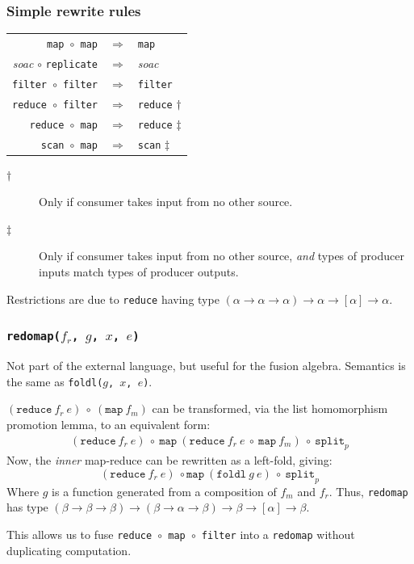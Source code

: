 \documentclass[rgb,dvipsnames]{beamer}
\begin{document}
\begin{frame}[fragile]
  \frametitle{Simple rewrite rules}

  \begin{center}
    \begin{tabular}{rcl}
      \texttt{map $\circ$ map}    & $\Rightarrow$ & \texttt{map} \\
      \textit{soac} $\circ$ \texttt{replicate} & $\Rightarrow$ & \textit{soac} \\
      \texttt{filter $\circ$ filter} & $\Rightarrow$ & \texttt{filter}  \\
      \texttt{reduce $\circ$ filter} & $\Rightarrow$ & \texttt{reduce} $\dag$  \\
      \texttt{reduce $\circ$ map} & $\Rightarrow$ & \texttt{reduce} $\ddag$ \\
      \texttt{scan $\circ$ map} & $\Rightarrow$ & \texttt{scan} $\ddag$ \\
    \end{tabular}
  \end{center}

  \begin{description}
  \item[$\dag$] Only if consumer takes input from no other
    source.
  \item[$\ddag$] Only if consumer takes input from no other source,
    \textit{and} types of producer inputs match types of producer
    outputs.
  \end{description}

  Restrictions are due to \texttt{reduce} having type
  $(\alpha\rightarrow\alpha\rightarrow\alpha)\rightarrow\alpha\rightarrow[\alpha]\rightarrow\alpha$.

\end{frame}

\begin{frame}[fragile,t]
  \frametitle{  \texttt{redomap($f_{r}$, $g$, $x$, $e$)}}

  Not part of the external language, but useful for the fusion
  algebra.  Semantics is the same as \texttt{\tt foldl($g$, $x$, $e$)}.

  $(\texttt{reduce}\ f_{r}\ e)\ \circ\ (\texttt{map}\ f_{m})$ can be
  transformed, via the list homomorphism promotion lemma, to an
  equivalent form:
  \begin{gather*}
    (\texttt{reduce}\ f_{r}\ e)\ \circ\ \texttt{map}\
    ({\texttt{reduce}\ f_{r}\ e\ \circ\ \texttt{map}\ f_{m}})\ \circ\
    \texttt{split}_{p}
  \end{gather*}
  Now, the \textit{inner} map-reduce can be rewritten as a left-fold,
  giving:
  \[
  (\texttt{reduce}\ f_{r}\
  e)\ \circ \texttt{map} \ ({\texttt{foldl}\ g\ e})\ \circ\ \texttt{split}_{p}
  \]
  Where $g$ is a function generated from a composition of $f_{m}$ and
  $f_{r}$.  Thus, \texttt{redomap} has type
  $(\beta\rightarrow\beta\rightarrow\beta)\rightarrow(\beta\rightarrow\alpha\rightarrow\beta)\rightarrow\beta\rightarrow[\alpha]\rightarrow\beta$.

This allows us to fuse
  \texttt{reduce~$\circ$~map~$\circ$~filter} into a \texttt{redomap}
  without duplicating computation.
\end{frame}
\end{document}
